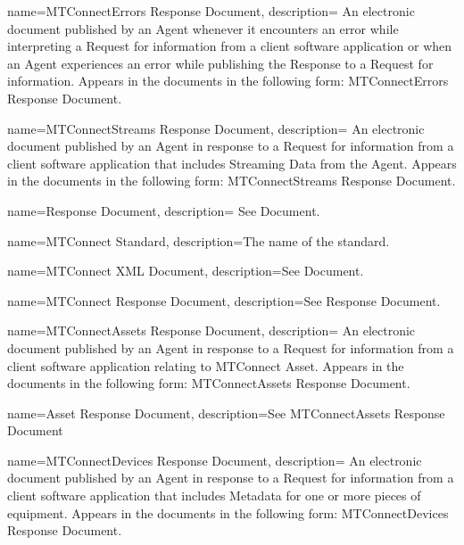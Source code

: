 {
    name={MTConnectErrors Response Document},
	description={
	An electronic document published by an \gls{Agent} whenever it encounters an error while interpreting a \gls{Request} for information from a client software application or when an \gls{Agent} experiences an error while publishing the \gls{Response} to a \gls{Request} for information.
	Appears in the documents in the following form: \gls{MTConnectErrors Response Document}.
}
}

{
    name={MTConnectStreams Response Document},
	description={
	An electronic document published by an \gls{Agent} in response to a \gls{Request} for information from a client software application that includes \gls{Streaming Data} from the \gls{Agent}.
	Appears in the documents in the following form: \gls{MTConnectStreams Response Document}.
}
}

{
    name={Response Document},
	description={
	See \gls{Document}.
}
}

{
    name={MTConnect Standard},
	description={The name of the standard.}
}

{
    name={MTConnect XML Document},
	description={See \gls{Document}.}
}

{
    name={MTConnect Response Document},
	description={See \gls{Response Document}.}
}

{
    name={MTConnectAssets Response Document},
	description={
	An electronic document published by an \gls{Agent} in response to a \gls{Request} for information from a client software application relating to \gls{MTConnect Asset}.
	Appears in the documents in the following form: \gls{MTConnectAssets Response Document}.
}
}

{
    name={Asset Response Document},
	description={See \gls{MTConnectAssets Response Document}}
}

{
    name={MTConnectDevices Response Document},
	description={
	An electronic document published by an \gls{Agent} in response to a \gls{Request} for information from a client software application that includes \gls{Metadata} for one or more pieces of equipment.
	Appears in the documents in the following form: \gls{MTConnectDevices Response Document}.
}
}

